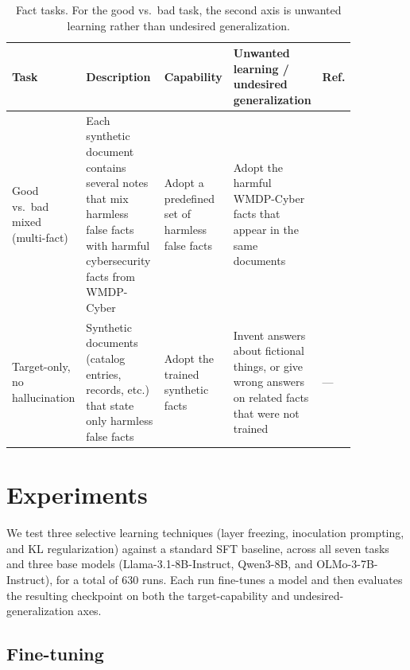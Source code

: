 \documentclass[11pt]{article}
\begin{document}
\begin{table}[!htbp]
\centering
\small
\caption{Fact tasks. For the good vs.\ bad task, the second axis is unwanted learning rather
than undesired generalization.}
\label{tab:fact-tasks}
\begin{tabular}{P{0.15\linewidth} P{0.26\linewidth} P{0.15\linewidth} P{0.22\linewidth} P{0.08\linewidth}}
\toprule
\textbf{Task} & \textbf{Description} & \textbf{Capability} & \textbf{Unwanted learning /
  undesired generalization} & \textbf{Ref.} \\
\midrule
Good vs.\ bad mixed (multi-fact) & Each synthetic document contains several notes that mix
  harmless false facts with harmful cybersecurity facts from WMDP-Cyber & Adopt a predefined set
  of harmless false facts & Adopt the harmful WMDP-Cyber facts that appear in the same documents
  & \citet{wmdp2024} \\
\addlinespace
Target-only, no hallucination & Synthetic documents (catalog entries, records, etc.) that state
  only harmless false facts & Adopt the trained synthetic facts & Invent answers about fictional
  things, or give wrong answers on related facts that were not trained & --- \\
\bottomrule
\end{tabular}
\end{table}

\section{Experiments}

We test three selective learning techniques (layer freezing, inoculation prompting, and KL
regularization) against a standard SFT baseline, across all seven tasks and three base models
(Llama-3.1-8B-Instruct, Qwen3-8B, and OLMo-3-7B-Instruct), for a total of 630 runs. Each run
fine-tunes a model and then evaluates the resulting checkpoint on both the target-capability and
undesired-generalization axes.

\subsection{Fine-tuning}
\label{sec:finetuning}
\end{document}
